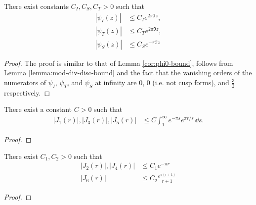 \begin{lemma}\label{lemma:psi-bound}\leanok
    There exist constants $C_I, C_S, C_T > 0$ such that
    \begin{align}
        |\psi_I(z)| &\le C_I e^{2\pi \Im z}, \label{eqn:psiI-bound} \\
        |\psi_T(z)| &\le C_T e^{2\pi \Im z}, \label{eqn:psiT-bound} \\
        |\psi_S(z)| &\le C_S e^{- \pi \Im z} \label{eqn:psiS-bound}
\end{align}
\end{lemma}
\begin{proof}\leanok
    The proof is similar to that of Lemma \ref{cor:phi0-bound}, follows from Lemma \ref{lemma:mod-div-disc-bound} and the fact that the vanishing orders of the numerators of $\psi_I$, $\psi_T$, and $\psi_S$ at infinity are $0$, $0$ (i.e. not cusp forms), and $\frac{3}{2}$ respectively.
\end{proof}

\begin{lemma}\label{lemma:bound-J1-J3-J5}\leanok
There exist a constant $C > 0$ such that
\begin{align}
    |J_1(r)|, |J_3(r)|, |J_5(r)| &\le C \int_1^{\infty} e^{-\pi s} e^{\pi r / s}\, \dd s.
\end{align}
\end{lemma}
\begin{proof}\leanok
\end{proof}

\begin{lemma}\label{lemma:bound-J2-J4-J6}\leanok
    There exist $C_1, C_2 > 0$ such that
    \begin{align}
        |J_2(r)|, |J_4(r)| &\le C_1 e^{-\pi r} \\
        |J_6(r)| &\le C_2 \frac{e^{\pi (r + 1)}}{r + 1}
    \end{align}
\end{lemma}
\begin{proof}
\leanok
\end{proof}




